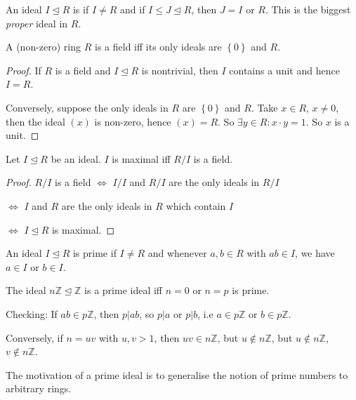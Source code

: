 \documentclass[egregdoesnotlikesansseriftitles,a4paper]{scrartcl}
\begin{document}
\begin{definition*}
       An ideal $I \unlhd R$ is  if $I \neq R$ and if $I \leq J \unlhd R$, then $J=I$ or $R$. This is the biggest \emph{proper} ideal in $R$.
\end{definition*}
\begin{lemma}
       A (non-zero) ring $R$ is a field iff its only ideals are $\left\{0\right\}$ and $R$.
       \begin{proof}
            If $R$ is a field and $I \unlhd R$ is nontrivial, then $I$ contains a unit and hence $I=R$.
      
            Conversely, suppose the only ideals in $R$ are $\left\{0\right\}$ and $R$. Take $x \in R$, $x \neq 0$, then the ideal $(x)$ is non-zero, hence $(x)=R$. So $\exists y \in R: x \cdot y=1$. So $x$ is a unit. 
      \end{proof}
\end{lemma}
\begin{proposition}\label{mideal1}
       Let $I \unlhd R$ be an ideal. $I$ is maximal iff $R/I$ is a field.
       \begin{proof}
            $R/I$ is a field $\iff$ $I/I$ and $R/I$ are the only ideals in $R/I$ 
            
            $\iff$ $I$ and $R$ are the only ideals in $R$ which contain $I$
            
            $\iff$ $I \unlhd R$ is maximal.
     \end{proof}
\end{proposition}
\begin{definition*}
       An ideal $I \unlhd R$ is prime if $I \neq R$ and whenever $a,b \in R$ with $ab \in I$, we have $a \in I$ or $b \in I$.
\end{definition*}
\begin{example*}
       The ideal $n\mathbb{Z} \unlhd \mathbb{Z}$ is a prime ideal iff $n=0$ or $n=p$ is prime.

       Checking: If $ab\in p\mathbb{Z}$, then $p|ab$, so $p|a$ or $p|b$, i.e $a \in p\mathbb{Z}$ or $b \in p\mathbb{Z}$.

       Conversely, if $n=uv$ with $u,v >1$, then $uv \in n\mathbb{Z}$, but $u \notin n\mathbb{Z}$, but $u \notin n\mathbb{Z}$, $v \notin n\mathbb{Z}$.
       \begin{remark}
              The motivation of a prime ideal is to generalise the notion of prime numbers to arbitrary rings.
       \end{remark}
\end{example*}
\end{document}
